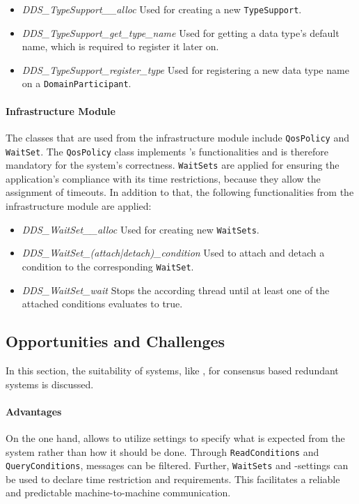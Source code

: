 \begin{itemize}
\item \textit{DDS\_TypeSupport\_\_alloc} Used for creating a new \texttt{TypeSupport}.
\item \textit{DDS\_TypeSupport\_get\_type\_name} Used for getting a data type's default name, which is required to register it later on.
\item \textit{DDS\_TypeSupport\_register\_type} Used for registering a new data type name on a \texttt{DomainParticipant}.
\end{itemize}

\paragraph{Infrastructure Module}
The classes that are used from the infrastructure module include \texttt{QosPolicy} and \texttt{WaitSet}.
The \texttt{QosPolicy} class implements 's  functionalities and is therefore mandatory for the system's correctness.
\texttt{WaitSets} are applied for ensuring the application's compliance with its time restrictions, because they allow the assignment of timeouts.
In addition to that, the following functionalities from the infrastructure module are applied:

\begin{itemize}
\item \textit{DDS\_WaitSet\_\_alloc} Used for creating new \texttt{WaitSets}.
\item \textit{DDS\_WaitSet\_(attach|detach)\_condition} Used to attach and detach a condition to the corresponding \texttt{WaitSet}.
\item \textit{DDS\_WaitSet\_wait} Stops the according thread until at least one of the attached conditions evaluates to true.
\end{itemize}


\subsection{Opportunities and Challenges}

In this section, the suitability of  systems, like , for consensus based redundant systems is discussed.

\paragraph{Advantages}
On the one hand,  allows to utilize  settings to specify what is expected from the system rather than how it should be done.
Through \texttt{ReadConditions} and \texttt{QueryConditions}, messages can be filtered.
Further, \texttt{WaitSets} and -settings can be used to declare time restriction and requirements.
This facilitates a reliable and predictable machine-to-machine communication.

